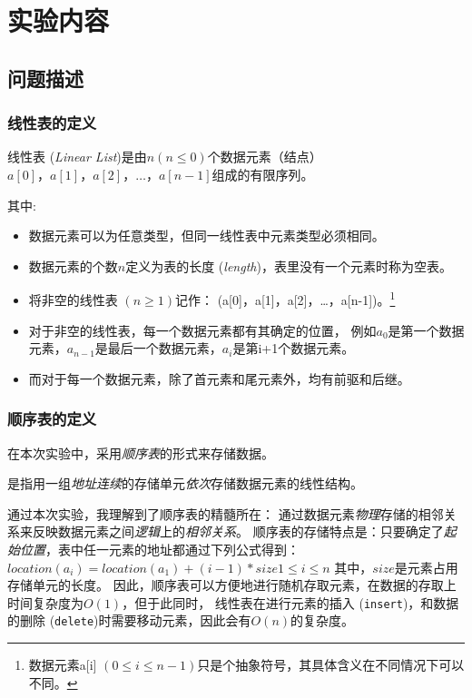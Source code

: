 \documentclass[format=draft,language=chinese,category=academic-report]{hustreport}
\begin{document}

\section{实验内容}\label{sec:2}
\subsection{问题描述}
\subsubsection{线性表的定义}
\begin{definition}\label{def:linear list}
    线性表 (\emph{Linear List})是由$n (n \le 0)$个数据元素（结点）$a[0]，a[1]，a[2]，\dots ，a[n-1]$组成的有限序列。
\end{definition}
其中:
\begin{itemize}
    \item 数据元素可以为任意类型，但同一线性表中元素类型必须相同。
    \item 数据元素的个数$n$定义为表的长度 (\emph{length})，表里没有一个元素时称为空表。
    \item 将非空的线性表 $(n \ge 1)$记作： (a[0]，a[1]，a[2]，\dots ，a[n-1])。\footnote{数据元素a[i] $(0\le i \le n-1)$只是个抽象符号，其具体含义在不同情况下可以不同。}
    \item 对于非空的线性表，每一个数据元素都有其确定的位置，
        例如$a_{0}$是第一个数据元素，$a_{n-1}$是最后一个数据元素，$a_i$是第i+1个数据元素。
    \item 而对于每一个数据元素，除了首元素和尾元素外，均有前驱和后继。
\end{itemize}
\subsubsection{顺序表的定义}
在本次实验中，采用\emph{顺序表}的形式来存储数据。
\begin{definition}\label{def:list}
    是指用一组\emph{地址连续}的存储单元\emph{依次}存储数据元素的线性结构。
\end{definition}
通过本次实验，我理解到了顺序表的精髓所在：
通过数据元素\emph{物理}存储的相邻关系来反映数据元素之间\emph{逻辑}上的\emph{相邻关系}。
\newline
顺序表的存储特点是：只要确定了\emph{起始位置}，表中任一元素的地址都通过下列公式得到：
$location(a_i) = location(a_1) + (i-1) * size 　1\le i\le n$ 其中，$size$是元素占用存储单元的长度。
因此，顺序表可以方便地进行随机存取元素，在数据的存取上时间复杂度为$O(1)$，但于此同时，
线性表在进行元素的插入 (\texttt{insert})，和数据的删除 (\texttt{delete})时需要移动元素，因此会有$O(n)$的复杂度。
\end{document}
